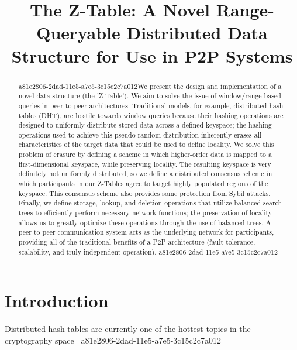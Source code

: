 \documentclass[12pt]{article}
\title{The Z-Table: A Novel Range-Queryable Distributed Data Structure for Use in P2P Systems}
\begin{document}
\maketitle

\begin{abstract}
a81e2806-2dad-11e5-a7e5-3c15c2c7a012We present the design and implementation of a novel data structure (the 'Z-Table'). We aim to solve the issue of window/range-based queries in peer to peer architectures. Traditional models, for example,  distributed hash tables (DHT), are hostile towards window queries because their hashing operations are designed to uniformly distribute stored data across a defined keyspace; the hashing operations used to achieve this pseudo-random distribution inherently erases all characteristics of the target data that could be used to define locality. We solve this problem of erasure by defining a scheme in which higher-order data is mapped to a first-dimensional keyspace, while preserving locality. The resulting keyspace is very definitely not uniformly distributed, so we define a distributed consensus scheme in which participants in our Z-Tables agree to target highly populated regions of the keyspace. This consensus scheme also provides some protection from Sybil attacks. Finally, we define storage, lookup, and deletion operations that utilize balanced search trees to efficiently perform necessary network functions; the preservation of locality allows us to greatly optimize these operations through the use of balanced trees. A peer to peer communication system acts as the underlying network for participants, providing all of the traditional benefits of a P2P architecture (fault tolerance, scalability, and truly independent operation).
a81e2806-2dad-11e5-a7e5-3c15c2c7a012\end{abstract}


\newpage
\section{Introduction}
Distributed hash tables are currently one of the hottest topics in the cryptography space~\cite{Stoica:2001dj,Rowstron:2001ea,Ratnasamy:2001wn}
a81e2806-2dad-11e5-a7e5-3c15c2c7a012
\printbibliography
\end{document}
